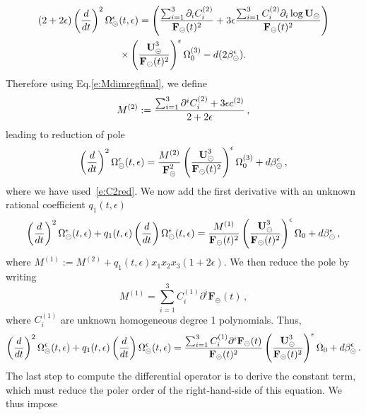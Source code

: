 \documentclass[a4paper,12pt]{article}
\numberwithin{equation}{section}
\numberwithin{figure}{section}
\def\su{\circleddash}
\begin{document}
%
\begin{multline}
 (2+2\epsilon)\left(d\over dt\right)^2
  \Omega_{\su}^{\epsilon}(t,\epsilon)=
 \left({\sum_{i=1}^3 \partial_i C_i^{(2)}\over
     \textbf{F}_\su(t)^{2}}+3\epsilon{\sum_{i=1}^3 C_i^{(2)}\partial_i
     \log \textbf{U}_\su\over \textbf{F}_\su(t)^{2}}\right)\cr \times\left(\textbf{U}_\su^3\over \textbf{F}_\su(t)^2\right)^\epsilon \Omega_0^{(3)}-d(2\beta_\su^\epsilon).
\end{multline}
%
Therefore using Eq.\eqref{e:Mdimregfinal}, we define
\begin{equation}
  \label{e:M2}
  M^{(2)}:={\sum_{i=1}^3 \partial^i  C_i^{(2)}+3\epsilon
    c^{(2)}\over 2+2\epsilon} \,, 
\end{equation}
leading to reduction of pole
\begin{equation}
 \left(d\over dt\right)^2
  \Omega_{\su}^{\epsilon}(t,\epsilon)=
{M^{(2)}\over
     \textbf{F}_\su^{2}}\left(\textbf{U}_\su^3\over \textbf{F}_\su(t)^2\right)^\epsilon \Omega_0^{(3)}+d\beta_\su^\epsilon \, ,
 \end{equation}
where we have used~\eqref{e:C2red}.
%
We now add the first derivative with an unknown rational coefficient $q_1(t,\epsilon)$
\begin{multline}
 \left(d\over dt\right)^2
  \Omega_{\su}^{\epsilon}(t,\epsilon) +q_1(t,\epsilon) \left(d\over dt\right)
  \Omega_{\su}^{\epsilon}(t,\epsilon) =
{M^{(1)}\over
     \textbf{F}_\su(t)^{2}}\left(\textbf{U}_\su^3\over \textbf{F}_\su(t)^2\right)^\epsilon \Omega_0+d\beta_\su^\epsilon \, , 
 \end{multline}
where $M^{(1)}:=M^{(2)}+q_1(t,\epsilon) x_1x_2x_3(1+2\epsilon)$.
 We then reduce the pole by writing
 \begin{equation}\label{e:M2red}
   M^{(1)}= \sum_{i=1}^3
   C_i^{(1)} \partial^i \textbf{F}_\su(t) \,, 
 \end{equation}
 where $ C_i^{(1)}$ are unknown homogeneous degree 1 polynomials.
Thus,
\begin{equation}
 \left(d\over dt\right)^2
  \Omega_{\su}^{\epsilon}(t,\epsilon) +q_1(t,\epsilon) \left(d\over dt\right)
  \Omega_{\su}^{\epsilon}(t,\epsilon) =
{ \sum_{i=1}^3
   C_i^{(1)} \partial^i \textbf{F}_\su(t)\over
     \textbf{F}_\su(t)^{2}}\left(\textbf{U}_\su^3\over \textbf{F}_\su(t)^2\right)^\epsilon \Omega_0+d\beta_\su^\epsilon \,.
 \end{equation}
%
The last step to compute the differential operator is to derive the constant term, which must reduce the poler order of the right-hand-side of this equation. We thus impose
\end{document}
